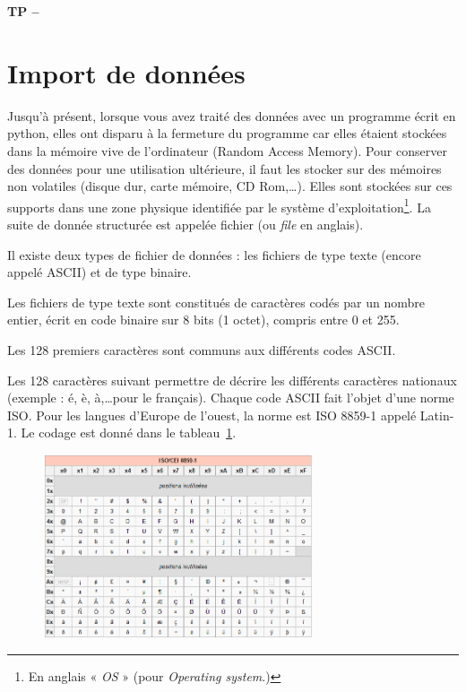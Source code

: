 

%




\begin{center}
{\Large\bf TP \no {\numero} -- \descrip}
\end{center}

\section{Import de données}

Jusqu'à présent, lorsque vous avez traité des données avec un programme écrit en python, elles ont disparu à la fermeture du programme car elles étaient stockées dans la mémoire vive de l'ordinateur (Random Access Memory). Pour conserver des données pour une utilisation ultérieure, il faut les stocker sur des mémoires non volatiles (disque dur, carte mémoire, CD Rom,\dots). Elles sont stockées sur ces supports dans une zone physique identifiée par le système d'exploitation\footnote{En anglais « \textit{OS} » (pour \textit{Operating system}.)}. La suite de donnée structurée est appelée fichier (ou \textit{file} en anglais).

Il existe deux types de fichier de données : les fichiers de type texte (encore appelé ASCII) et de type binaire.

Les fichiers de type texte sont constitués de caractères codés par un nombre entier, écrit en code binaire sur 8 bits (1 octet), compris entre 0 et 255.

Les 128 premiers caractères sont communs aux différents codes ASCII. 

Les 128 caractères suivant permettre de décrire les différents caractères nationaux (exemple : é, è, à,\dots pour le français). Chaque code ASCII fait l'objet d'une norme ISO. Pour les langues d'Europe de l'ouest, la norme est ISO 8859-1 appelé Latin-1. Le codage est donné dans le tableau~\ref{fig:tableASCII}.

\begin{figure}[htp]
 \centering
 \includegraphics[width=8cm]{img/tableASCII}
 \label{fig:tableASCII}
\end{figure}

